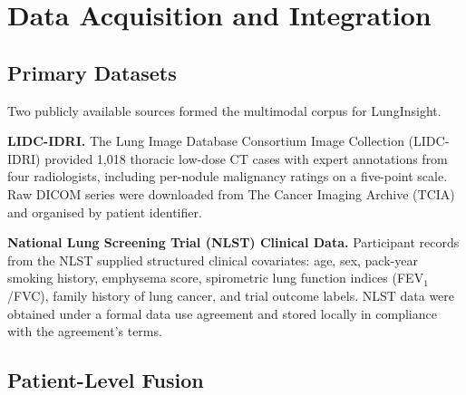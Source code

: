 {\section{Data Acquisition and Integration}

\subsection{Primary Datasets}

Two publicly available sources formed the multimodal corpus for LungInsight.

\textbf{LIDC-IDRI.}
The Lung Image Database Consortium Image Collection (LIDC-IDRI) provided 1{,}018 thoracic
low-dose CT cases with expert annotations from four radiologists, including per-nodule
malignancy ratings on a five-point scale. Raw DICOM series were downloaded from The Cancer
Imaging Archive (TCIA) and organised by patient identifier.

\textbf{National Lung Screening Trial (NLST) Clinical Data.}
Participant records from the NLST supplied structured clinical covariates: age, sex, pack-year
smoking history, emphysema score, spirometric lung function indices (FEV$_1$/FVC), family
history of lung cancer, and trial outcome labels. NLST data were obtained under a formal data
use agreement and stored locally in compliance with the agreement's terms.

\subsection{Patient-Level Fusion}

}
